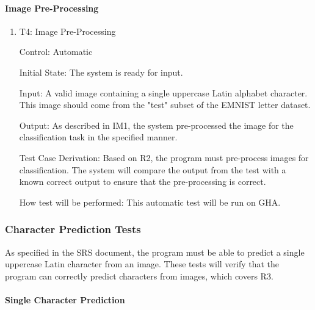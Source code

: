 \documentclass[12pt, titlepage]{article}
\begin{document}
\paragraph{Image Pre-Processing}

\begin{enumerate}

\item{T4: Image Pre-Processing\\}

Control: Automatic

Initial State: The \progname{} system is ready for input.

Input: A valid image containing a single uppercase Latin alphabet character.
This image should come from the "test" subset of the EMNIST letter dataset.

Output: As described in IM1, the system pre-processed the image for the
classification task in the specified manner.

Test Case Derivation: Based on R2, the program must pre-process images for
classification. The system will compare the output from the test with a known
correct output to ensure that the pre-processing is correct.

How test will be performed: This automatic test will be run on GHA.

\end{enumerate}

\subsubsection{Character Prediction Tests}

As specified in the SRS document, the program must be able to predict a single
uppercase Latin character from an image. These tests will verify that the program
can correctly predict characters from images, which covers R3.

\paragraph{Single Character Prediction}
\end{document}
